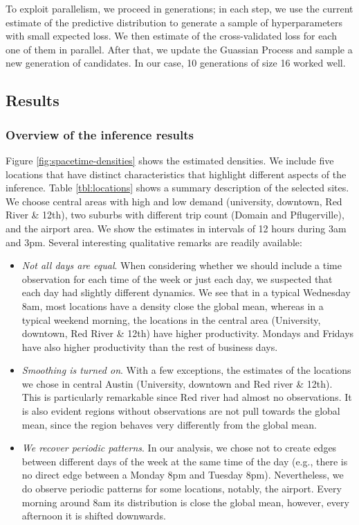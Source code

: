 \documentclass[a4paper, 11pt]{article}
\begin{document}
To exploit parallelism, we proceed in generations; in each step, we use the current estimate of the predictive distribution to generate a sample of hyperparameters with small expected loss. We then estimate of the cross-validated loss for each one of them in parallel. After that, we update the Guassian Process and sample a new generation of candidates. In our case, 10 generations of size 16 worked well. 


\subsection{Results}

\subsubsection{Overview of the inference results}

Figure \ref{fig:spacetime-densities} shows the estimated densities. We include five locations that have distinct characteristics that highlight different aspects of the inference. Table \ref{tbl:locations} shows a summary description of the selected sites. We choose central areas with high and low demand (university, downtown, Red River \& 12th), two suburbs with different trip count (Domain and Pflugerville), and the airport area. We show the estimates in intervals of 12 hours during 3am and 3pm. Several interesting qualitative remarks are readily available:

\begin{itemize}
    \item \textit{Not all days are equal}. When considering whether we should include a time observation for each time of the week or just each day, we suspected that each day had slightly different dynamics. We see that in a typical Wednesday 8am, most locations have a density close the global mean, whereas in a typical weekend morning, the locations in the central area (University, downtown, Red River \& 12th) have higher productivity. Mondays and Fridays have also higher productivity than the rest of business days. 
    \item \textit{Smoothing is turned on}. With a few exceptions, the estimates of the locations we chose in central Austin (University, downtown and Red river \& 12th). This is particularly remarkable since Red river had almost no observations. It is also evident regions without observations are not pull towards the global mean, since the region behaves very differently from the global mean.
    \item \textit{We recover periodic patterns}. In our analysis, we chose not to create edges between different days of the week at the same time of the day (e.g., there is no direct edge between a Monday 8pm and Tuesday 8pm). Nevertheless, we do observe periodic patterns for some locations, notably, the airport. Every morning around 8am its distribution is close the global mean, however, every afternoon it is shifted downwards.
\end{itemize}
\end{document}
